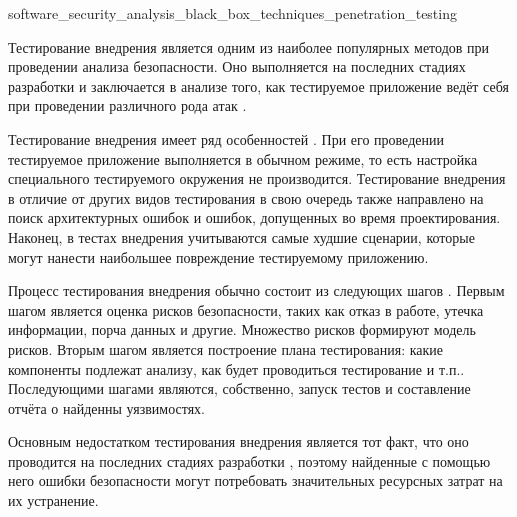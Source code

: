 
	{software_security_analysis_black_box_techniques_penetration_testing}

%
Тестирование внедрения является одним из наиболее популярных методов при проведении анализа 
безопасности. 
%
Оно выполняется на последних стадиях разработки  и заключается в анализе 
того, как тестируемое приложение ведёт себя при проведении различного рода атак 
.

%
Тестирование внедрения имеет ряд особенностей . 
%
При его проведении тестируемое приложение выполняется в обычном режиме, то есть настройка 
специального тестируемого окружения не производится. 
%
Тестирование внедрения в отличие от других видов тестирования в свою очередь также направлено 
на поиск архитектурных ошибок и ошибок, допущенных во время проектирования. 
%
Наконец, в тестах внедрения учитываются самые худшие сценарии, которые могут нанести наибольшее 
повреждение тестируемому приложению.

%
Процесс тестирования внедрения обычно состоит из следующих шагов . 
%
Первым шагом является оценка рисков безопасности, таких как отказ в работе, утечка информации, 
порча данных и другие. 
%
Множество рисков формируют модель рисков. 
%
Вторым шагом является построение плана тестирования: какие компоненты подлежат анализу, как будет 
проводиться тестирование и т.п.. 
%
Последующими шагами являются, собственно, запуск тестов и составление отчёта о найденны уязвимостях.

%
Основным недостатком тестирования внедрения является тот факт, что оно проводится на последних 
стадиях разработки , поэтому найденные с помощью него ошибки безопасности 
могут потребовать значительных ресурсных затрат на их устранение.